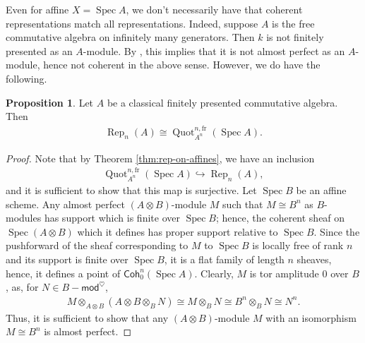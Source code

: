 \documentclass{article}
\numberwithin{equation}{section}
\theoremstyle{quest}
\theoremstyle{definition}
\newtheorem{prop}[thm]{Proposition}
\theoremstyle{remark}
\newcommand{\msf}{\mathsf}
\newcommand{\Mod}{-\msf{mod}}
\DeclareMathOperator{\Spec}{Spec}
\DeclareMathOperator{\Rep}{Rep}
\DeclareMathOperator{\Quot}{Quot}
\begin{document}
Even for affine $X=\Spec A$, we don't necessarily have that coherent representations match all representations. Indeed, suppose $A $ is the free commutative algebra on infinitely many generators. Then $k$ is not finitely presented as an $A$-module. By \cite[Proposition 7.2.4.17]{HA}, this implies that it is not almost perfect as an $A$-module, hence not coherent in the above sense. However, we do have the following.
\begin{prop}\label{prop:quot-scheme-is-reps}
 	Let $A$ be a classical finitely presented commutative algebra. Then 
	\begin{align*}
		\Rep_n(A)\cong \Quot^{n,\text{fr}}_{A^n}(\Spec A).
	\end{align*} 
 \end{prop} 
 \begin{proof}
	 Note that by Theorem \ref{thm:rep-on-affines}, we have an inclusion
	 \begin{align*}
		 \Quot^{n,\text{fr}}_{A^n}(\Spec A) \hookrightarrow \Rep_n(A),
	 \end{align*} 
	 and it is sufficient to show that this map is surjective. Let $\Spec B$ be an affine scheme. Any almost perfect $(A\otimes B)$-module $M$ such that $M\cong B^n$ as $B$-modules has support which is finite over $\Spec B$; hence, the coherent sheaf on $\Spec(A\otimes B)$ which it defines has proper support relative to $\Spec B$. Since the pushforward of the sheaf corresponding to $M$ to $\Spec B$ is locally free of rank $n$ and its support is finite over $\Spec B$, it is a flat family of length $n$ sheaves, hence, it defines a point of $\mathsf{Coh}_0^n(\Spec A)$. Clearly, $M$ is tor amplitude 0 over $B$, as, for $N\in B\Mod^\heartsuit$,
	 \begin{align*}
	 	M\otimes _{A\otimes B}(A\otimes B \otimes _B N)\cong M\otimes _B N \cong B^n\otimes _B N\cong N^n.
	 \end{align*}  Thus, it is sufficient to show that any $(A\otimes B)$-module $M$ with an isomorphism $M\cong B^n$ is almost perfect.


\end{proof}
\end{document}
